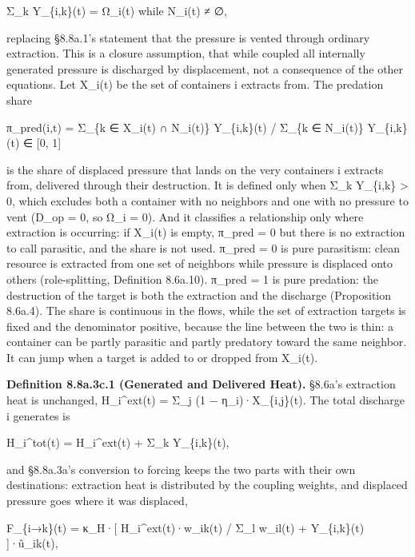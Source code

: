 \documentclass[
]{article}
\begin{document}
Σ\_k Y\_\{i,k\}(t) = Ω\_i(t) while N\_i(t) ≠ ∅,

replacing §8.8a.1's statement that the pressure is vented through
ordinary extraction. This is a closure assumption, that while coupled
all internally generated pressure is discharged by displacement, not a
consequence of the other equations. Let X\_i(t) be the set of containers
i extracts from. The predation share

π\_pred(i,t) = Σ\_\{k ∈ X\_i(t) ∩ N\_i(t)\} Y\_\{i,k\}(t) / Σ\_\{k ∈
N\_i(t)\} Y\_\{i,k\}(t) ∈ {[}0, 1{]}

is the share of displaced pressure that lands on the very containers i
extracts from, delivered through their destruction. It is defined only
when Σ\_k Y\_\{i,k\} \textgreater{} 0, which excludes both a container
with no neighbors and one with no pressure to vent (D\_op = 0, so Ω\_i =
0). And it classifies a relationship only where extraction is occurring:
if X\_i(t) is empty, π\_pred = 0 but there is no extraction to call
parasitic, and the share is not used. π\_pred = 0 is pure parasitism:
clean resource is extracted from one set of neighbors while pressure is
displaced onto others (role-splitting, Definition 8.6a.10). π\_pred = 1
is pure predation: the destruction of the target is both the extraction
and the discharge (Proposition 8.6a.4). The share is continuous in the
flows, while the set of extraction targets is fixed and the denominator
positive, because the line between the two is thin: a container can be
partly parasitic and partly predatory toward the same neighbor. It can
jump when a target is added to or dropped from X\_i(t).

\textbf{Definition 8.8a.3c.1 (Generated and Delivered Heat).} §8.6a's
extraction heat is unchanged, H\_i\^{}ext(t) = Σ\_j (1 −
η\_i)·X\_\{i,j\}(t). The total discharge i generates is

H\_i\^{}tot(t) = H\_i\^{}ext(t) + Σ\_k Y\_\{i,k\}(t),

and §8.8a.3a's conversion to forcing keeps the two parts with their own
destinations: extraction heat is distributed by the coupling weights,
and displaced pressure goes where it was displaced,

F\_\{i→k\}(t) = κ\_H·{[} H\_i\^{}ext(t)·w\_ik(t) / Σ\_l w\_il(t) +
Y\_\{i,k\}(t) {]}·û\_ik(t),
\end{document}
